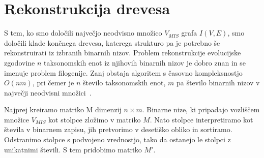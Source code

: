 \documentclass[a4paper, 12pt]{book}
\begin{document}
\section{Rekonstrukcija drevesa}
S tem, ko smo določili največjo neodvisno množico $V_{MIS}$ grafa $I(V, E)$, smo določili klade končnega drevesa, katerega strukturo pa je potrebno še rekonstruirati iz izbranih binarnih nizov. Problem rekonstrukcije evolucijske zgodovine $n$ taksonomskih enot iz njihovih binarnih nizov je dobro znan in se imenuje problem filogenije. Zanj obstaja algoritem s časovno kompleksnostjo $O(nm)$, pri čemer je $n$ število taksonomskih enot, $m$ pa število binarnih nizov v največji neodvisni množici~\cite{gd}.

Najprej kreiramo matriko M dimenzij $n×m$. Binarne nize, ki pripadajo vozliščem množice $V_{MIS}$ kot stolpce zložimo v matriko $M$. Nato stolpce interpretiramo kot števila v binarnem zapisu, jih pretvorimo v desetiško obliko in sortiramo. Odstranimo stolpce s podvojeno vrednostjo, tako da ostanejo le stolpci z unikatnimi števili. S tem pridobimo matriko $M'$.
\end{document}
